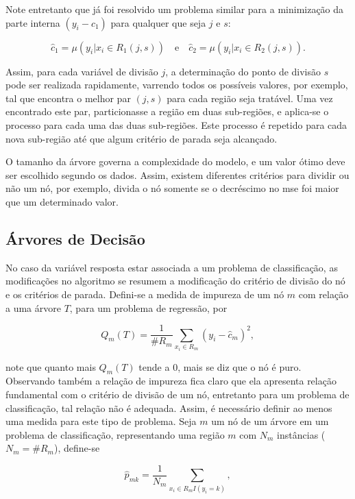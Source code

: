 Note entretanto que já foi resolvido um problema similar para a minimização da parte interna $(y_i-c_1)$ para qualquer que seja $j$ e $s$:

\begin{equation}
\hat{c}_1=\mu(y_i|x_i\in{R_1(j,s)})\quad\mbox{e}\quad\hat{c}_2=\mu(y_i|x_i\in{R_2(j,s)})\mbox{.}
\end{equation}

Assim, para cada variável de divisão $j$, a determinação do ponto de divisão $s$ pode ser realizada rapidamente, varrendo todos os possíveis valores, por exemplo, tal que encontra o melhor par $(j,s)$ para cada região seja tratável. Uma vez encontrado este par, particionasse a região em duas sub-regiões, e aplica-se o processo para cada uma das duas sub-regiões. Este processo é repetido para cada nova sub-região até que algum critério de parada seja alcançado.

O tamanho da árvore governa a complexidade do modelo, e um valor ótimo deve ser escolhido segundo os dados. Assim, existem diferentes critérios para dividir ou não um nó, por exemplo, divida o nó somente se o decréscimo no mse foi maior que um determinado valor.


\subsection{Árvores de Decisão}

No caso da variável resposta estar associada a um problema de classificação, as modificações no algoritmo se resumem a modificação do critério de divisão do nó e os critérios de parada. Defini-se a medida de impureza de um nó $m$ com relação a uma árvore $T$, para um problema de regressão, por

\begin{equation}
Q_m(T)=\frac{1}{\#R_m}\sum_{x_i\in{R_m}}(y_i-\hat{c}_m)^2\mbox{,}~
\end{equation}

note que quanto mais $Q_m(T)$ tende a $0$, mais se diz que o nó é puro. Observando também a relação de impureza fica claro que ela apresenta relação fundamental com o critério de divisão de um nó, entretanto para um problema de classificação, tal relação não é adequada. Assim, é necessário definir ao menos uma medida para este tipo de problema. Seja $m$ um nó de um árvore em um problema de classificação, representando uma região $m$ com $N_m$ instâncias ($N_m=\#R_m$), define-se

\begin{equation}
\hat{p}_{mk}=\frac{1}{N_m}\sum_{x_i\in{R_m}I(y_i=k)}\mbox{,}~
\end{equation}


